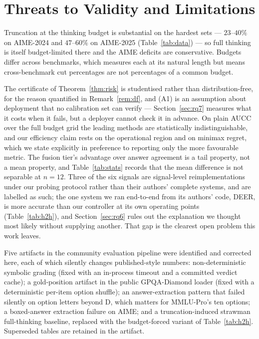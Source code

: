 \documentclass[acmsmall]{acmart}
\theoremstyle{acmdefinition}%
\theoremstyle{acmplain}}{}%
\begin{document}
\section{Threats to Validity and Limitations}\label{sec:limits}
Truncation at the thinking budget is substantial on the hardest sets --- $23$--$40\%$ on AIME-2024 and $47$--$60\%$ on AIME-2025 (Table~\ref{tab:data}) --- so full thinking is itself budget-limited there and the AIME deficits are conservative. Budgets differ across benchmarks, which measures each at its natural length but means cross-benchmark cut percentages are not percentages of a common budget.

The certificate of Theorem~\ref{thm:risk} is studentised rather than distribution-free, for the reason quantified in Remark~\ref{rem:df}, and (A1) is an assumption about deployment that no calibration set can verify --- Section~\ref{sec:rq7} measures what it costs when it fails, but a deployer cannot check it in advance. On plain AUCC over the full budget grid the leading methods are statistically indistinguishable, and our efficiency claim rests on the operational region and on minimax regret, which we state explicitly in preference to reporting only the more favourable metric. The fusion tier's advantage over answer agreement is a tail property, not a mean property, and Table~\ref{tab:stats} records that the mean difference is not separable at $n=12$. Three of the six signals are signal-level reimplementations under our probing protocol rather than their authors' complete systems, and are labelled as such; the one system we ran end-to-end from its authors' code, DEER, is more accurate than our controller at its own operating points (Table~\ref{tab:h2h}), and Section~\ref{sec:rq6} rules out the explanation we thought most likely without supplying another. That gap is the clearest open problem this work leaves.

Five artifacts in the community evaluation pipeline were identified and corrected here, each of which silently changes published-style numbers: non-deterministic symbolic grading (fixed with an in-process timeout and a committed verdict cache); a gold-position artifact in the public GPQA-Diamond loader (fixed with a deterministic per-item option shuffle); an answer-extraction pattern that failed silently on option letters beyond D, which matters for MMLU-Pro's ten options; a boxed-answer extraction failure on AIME; and a truncation-induced strawman full-thinking baseline, replaced with the budget-forced variant of Table~\ref{tab:h2h}. Superseded tables are retained in the artifact.
\end{document}
